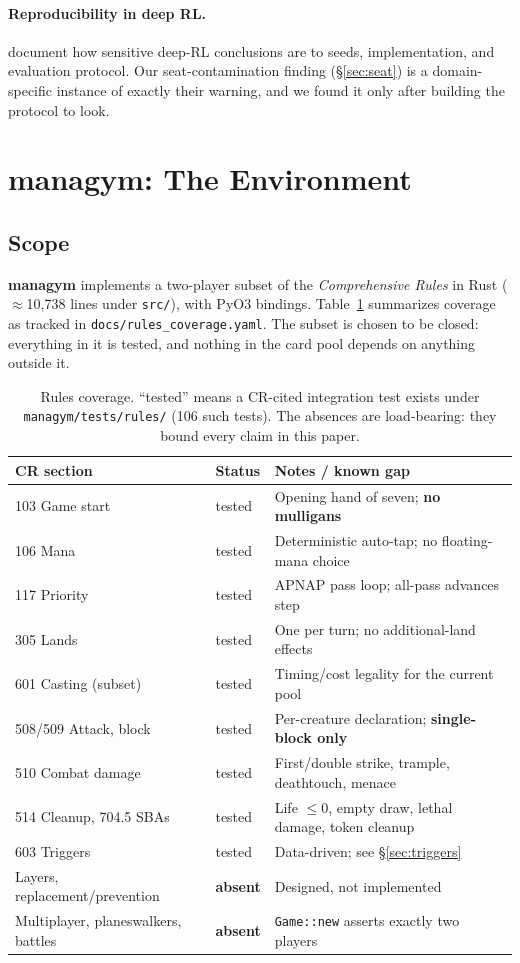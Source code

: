 \documentclass[11pt]{article}
\begin{document}
\paragraph{Reproducibility in deep RL.} \citet{henderson2018matters} document how sensitive deep-RL conclusions are to seeds, implementation, and evaluation protocol. Our seat-contamination finding (\S\ref{sec:seat}) is a domain-specific instance of exactly their warning, and we found it only after building the protocol to look.

\section{managym: The Environment}
\label{sec:managym}

\subsection{Scope}

\textbf{managym} implements a two-player subset of the \textit{Comprehensive Rules} in Rust ($\approx$10{,}738 lines under \texttt{src/}), with PyO3 bindings. Table~\ref{tab:rules} summarizes coverage as tracked in \texttt{docs/rules\_coverage.yaml}. The subset is chosen to be closed: everything in it is tested, and nothing in the card pool depends on anything outside it.

\begin{table}[t]
\centering\small
\begin{tabular}{llp{6.6cm}}
\toprule
\textbf{CR section} & \textbf{Status} & \textbf{Notes / known gap} \\
\midrule
103 Game start & tested & Opening hand of seven; \textbf{no mulligans} \\
106 Mana & tested & Deterministic auto-tap; no floating-mana choice \\
117 Priority & tested & APNAP pass loop; all-pass advances step \\
305 Lands & tested & One per turn; no additional-land effects \\
601 Casting (subset) & tested & Timing/cost legality for the current pool \\
508/509 Attack, block & tested & Per-creature declaration; \textbf{single-block only} \\
510 Combat damage & tested & First/double strike, trample, deathtouch, menace \\
514 Cleanup, 704.5 SBAs & tested & Life $\le 0$, empty draw, lethal damage, token cleanup \\
603 Triggers & tested & Data-driven; see \S\ref{sec:triggers} \\
\midrule
Layers, replacement/prevention & \textbf{absent} & Designed, not implemented \\
Multiplayer, planeswalkers, battles & \textbf{absent} & \texttt{Game::new} asserts exactly two players \\
\bottomrule
\end{tabular}
\caption{Rules coverage. ``tested'' means a CR-cited integration test exists under \texttt{managym/tests/rules/} (106 such tests). The absences are load-bearing: they bound every claim in this paper.}
\label{tab:rules}
\end{table}
\end{document}
